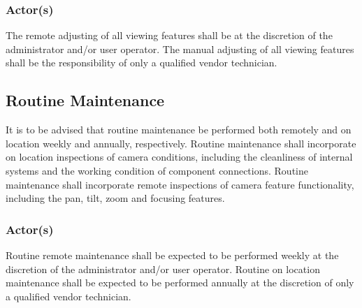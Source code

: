 \subsubsection{Actor(s)}
The remote adjusting of all viewing features shall be at the discretion of the administrator and/or user operator.
The manual adjusting of all viewing features shall be the responsibility of only a qualified vendor technician.

\subsection{Routine Maintenance}

It is to be advised that routine maintenance be performed both remotely and on location weekly and annually, respectively.
Routine maintenance shall incorporate on location inspections of camera conditions, including the cleanliness of internal systems and the working condition of component connections.
Routine maintenance shall incorporate remote inspections of camera feature functionality, including the pan, tilt, zoom and focusing features.

\subsubsection{Actor(s)}
Routine remote maintenance shall be expected to be performed weekly at the discretion of the administrator and/or user operator.
Routine on location maintenance shall be expected to be performed annually at the discretion of only a qualified vendor technician.
